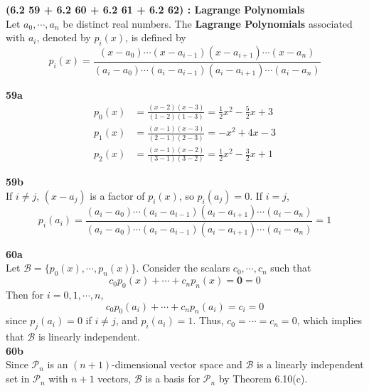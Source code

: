 \textbf{(6.2 59 + 6.2 60 + 6.2 61 + 6.2 62) : Lagrange Polynomials} \\
Let $a_0, \cdots, a_n$ be distinct real numbers. The \textbf{Lagrange Polynomials} associated with $a_i$, denoted by $p_i(x)$, is defined by \begin{equation*}
	p_i(x) = \frac{(x - a_0) \cdots (x - a_{i-1})(x - a_{i+1}) \cdots (x - a_n)}{(a_i - a_0) \cdots (a_i - a_{i-1})(a_i - a_{i+1}) \cdots (a_i - a_n)}
\end{equation*}

\textbf{59a} \\
\begin{align*}
	p_0(x) &= \frac{(x - 2)(x - 3)}{(1 - 2)(1 - 3)} = \frac{1}{2}x^2 - \frac{5}{2}x + 3 \\
	p_1(x) &= \frac{(x - 1)(x - 3)}{(2 - 1)(2 - 3)} = -x^2 + 4x - 3 \\
	p_2(x) &= \frac{(x - 1)(x - 2)}{(3 - 1)(3 - 2)} = \frac{1}{2}x^2 - \frac{3}{2}x + 1
\end{align*}

\textbf{59b} \\
If $i \neq j$, $(x - a_j)$ is a factor of $p_i(x)$, so $p_i(a_j) = 0$. If $i = j$, \begin{equation*}
	p_i(a_i) = \frac{(a_i - a_0) \cdots (a_i - a_{i-1})(a_i - a_{i+1}) \cdots (a_i - a_n)}{(a_i - a_0) \cdots (a_i - a_{i-1})(a_i - a_{i+1}) \cdots (a_i - a_n)} = 1
\end{equation*}

\textbf{60a} \\
Let $\mathcal{B} = \{p_0(x), \cdots, p_n(x)\}$. Consider the scalars $c_0, \cdots, c_n$ such that \begin{equation*}
	c_0p_0(x) + \cdots + c_np_n(x) = \textbf{0} = 0
\end{equation*} Then for $i = 0, 1, \cdots, n$, \begin{equation*}
	c_0p_0(a_i) + \cdots + c_np_n(a_i) = c_i = 0
\end{equation*} since $p_j(a_i) = 0$ if $i \neq j$, and $p_i(a_i) = 1$. Thus, $c_0 = \cdots = c_n = 0$, which implies that $\mathcal{B}$ is linearly independent. \\

\textbf{60b} \\
Since $\mathscr{P}_n$ is an $(n+1)$-dimensional vector space and $\mathcal{B}$ is a linearly independent set in $\mathscr{P}_n$ with $n + 1$ vectors, $\mathcal{B}$ is a basis for $\mathscr{P}_n$ by Theorem 6.10(c). \\

